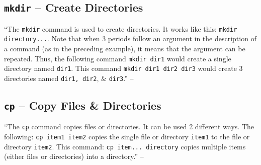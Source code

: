 \documentclass[oneside]{book}
\numberwithin{equation}{section}
\begin{document}
\subsection{\texttt{mkdir} -- Create Directories}
``The \texttt{mkdir} command is used to create directories. It works like this: \texttt{mkdir directory...}. Note that when 3 periods follow an argument in the description of a command (as in the preceding example), it means that the argument can be repeated. Thus, the following command \texttt{mkdir dir1} would create a single directory named \texttt{dir1}. This command \texttt{mkdir dir1 dir2 dir3} would create 3  directories named \texttt{dir1, dir2}, \& \texttt{dir3}.'' -- \cite[pp. 67--68]{Shotts2019}

\subsection{\texttt{cp} -- Copy Files \& Directories}
``The \texttt{cp} command copies files or directories. It can be used 2 different ways. The following: \texttt{cp item1 item2} copies the single file or directory \texttt{item1} to the file or directory \texttt{item2}. This command: \texttt{cp item... directory} copies multiple items (either files or directories) into a directory.'' -- \cite[p. 68]{Shotts2019}
\end{document}
